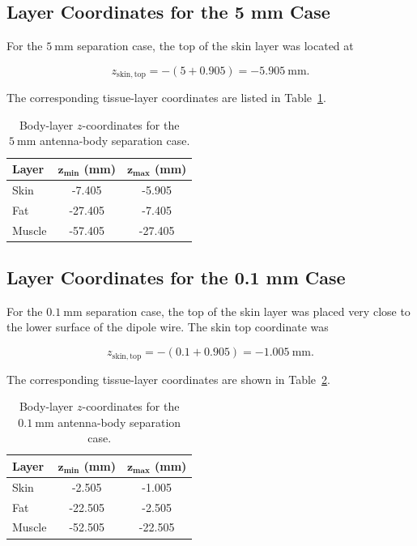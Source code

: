 \subsection{Layer Coordinates for the 5 mm Case}

For the \(5~\mathrm{mm}\) separation case, the top of the skin layer was located at

\[
z_{\mathrm{skin,top}} = -(5+0.905)
=
-5.905~\mathrm{mm}.
\]

The corresponding tissue-layer coordinates are listed in Table~\ref{tab:body-5mm-coordinates}.

\begin{table}[htbp]
\centering
\caption{Body-layer \(z\)-coordinates for the \(5~\mathrm{mm}\) antenna-body separation case.}
\label{tab:body-5mm-coordinates}
\begin{tabular}{lcc}
\hline
\textbf{Layer} & \(\boldsymbol{z_{\min}}\) \textbf{(mm)} & \(\boldsymbol{z_{\max}}\) \textbf{(mm)} \\
\hline
Skin & -7.405 & -5.905 \\
Fat & -27.405 & -7.405 \\
Muscle & -57.405 & -27.405 \\
\hline
\end{tabular}
\end{table}

\subsection{Layer Coordinates for the 0.1 mm Case}

For the \(0.1~\mathrm{mm}\) separation case, the top of the skin layer was placed very close to the lower surface of the dipole wire. The skin top coordinate was

\[
z_{\mathrm{skin,top}} = -(0.1+0.905)
=
-1.005~\mathrm{mm}.
\]

The corresponding tissue-layer coordinates are shown in Table~\ref{tab:body-0p1mm-coordinates}.

\begin{table}[htbp]
\centering
\caption{Body-layer \(z\)-coordinates for the \(0.1~\mathrm{mm}\) antenna-body separation case.}
\label{tab:body-0p1mm-coordinates}
\begin{tabular}{lcc}
\hline
\textbf{Layer} & \(\boldsymbol{z_{\min}}\) \textbf{(mm)} & \(\boldsymbol{z_{\max}}\) \textbf{(mm)} \\
\hline
Skin & -2.505 & -1.005 \\
Fat & -22.505 & -2.505 \\
Muscle & -52.505 & -22.505 \\
\hline
\end{tabular}
\end{table}

